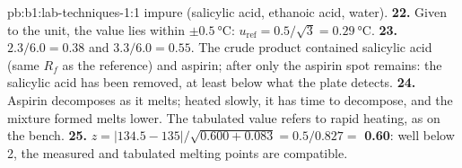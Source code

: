 \begin{solution}{pb:b1:lab-techniques-1:1}
impure (salicylic acid, ethanoic acid, water).
\textbf{22.} Given to the unit, the value lies within $\pm\qty{0.5}{\celsius}$:
$u_{\mathrm{ref}} = 0.5/\sqrt3 = \qty{0.29}{\celsius}$.
\textbf{23.} $2.3/6.0 = 0.38$ and $3.3/6.0 = 0.55$. The crude product
contained salicylic acid (same $R_f$ as the reference) and aspirin; after
 only the aspirin spot remains: the salicylic acid has
been removed, at least below what the plate detects.
\textbf{24.} Aspirin decomposes as it melts; heated slowly, it has time to
decompose, and the mixture formed melts lower. The tabulated value refers
to rapid heating, as on the bench.
\textbf{25.} $z = |134.5 - 135|/\sqrt{0.600 + 0.083} = 0.5/0.827 =$
\textbf{0.60}: well below 2, the measured and tabulated melting points are
compatible.
\end{solution}
